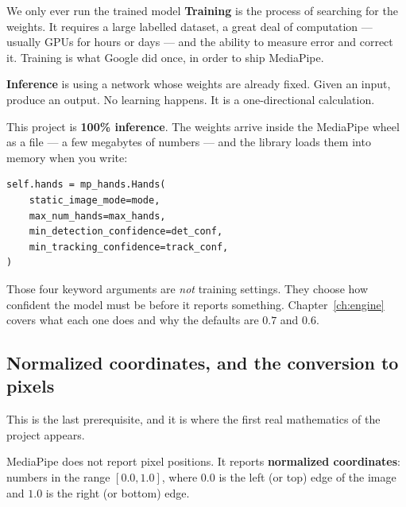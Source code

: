 \begin{mlconcept}{We only ever run the trained model}
\textbf{Training} is the process of searching for the weights. It requires a large labelled dataset,
a great deal of computation --- usually GPUs for hours or days --- and the ability to measure error
and correct it. Training is what Google did once, in order to ship MediaPipe.

\textbf{Inference} is using a network whose weights are already fixed. Given an input, produce an
output. No learning happens. It is a one-directional calculation.

This project is \textbf{100\% inference}. The weights arrive inside the MediaPipe wheel as a
 file --- a few megabytes of numbers --- and the library loads them into memory when
you write:

\begin{lstlisting}
self.hands = mp_hands.Hands(
    static_image_mode=mode,
    max_num_hands=max_hands,
    min_detection_confidence=det_conf,
    min_tracking_confidence=track_conf,
)
\end{lstlisting}

Those four keyword arguments are \emph{not} training settings. They choose how confident the model
must be before it reports something. Chapter~\ref{ch:engine} covers what each one does and why the
defaults are $0.7$ and $0.6$.
\end{mlconcept}

\subsection{Normalized coordinates, and the conversion to pixels}

This is the last prerequisite, and it is where the first real mathematics of the project appears.

MediaPipe does not report pixel positions. It reports \textbf{normalized coordinates}: numbers in the
range $[0.0, 1.0]$, where $0.0$ is the left (or top) edge of the image and $1.0$ is the right (or
bottom) edge.

